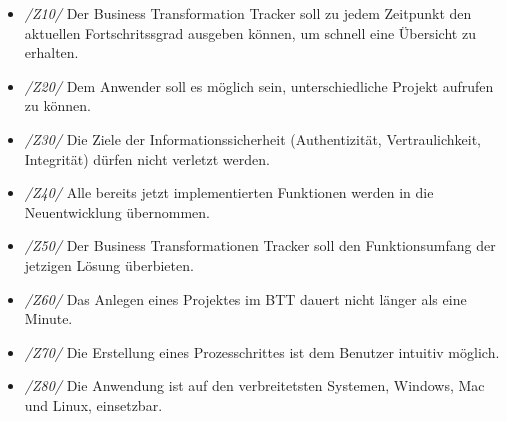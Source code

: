 \begin{itemize} 
    \item[] \emph{/Z10/} Der Business Transformation Tracker soll zu jedem Zeitpunkt den aktuellen Fortschritssgrad ausgeben können, um schnell eine Übersicht zu erhalten.
    \item[] \emph{/Z20/} Dem Anwender soll es möglich sein, unterschiedliche Projekt aufrufen zu können.
    \item[] \emph{/Z30/} Die Ziele der Informationssicherheit (Authentizität, Vertraulichkeit, Integrität) dürfen nicht verletzt werden.
    \item[] \emph{/Z40/} Alle bereits jetzt implementierten Funktionen werden in die Neuentwicklung übernommen.         
    \item[] \emph{/Z50/} Der Business Transformationen Tracker soll den Funktionsumfang der jetzigen Lösung überbieten.  
    \item[] \emph{/Z60/} Das Anlegen eines Projektes im BTT dauert nicht länger als eine Minute.
    \item[] \emph{/Z70/} Die Erstellung eines Prozesschrittes ist dem Benutzer intuitiv möglich.
    \item[] \emph{/Z80/} Die Anwendung ist auf den verbreitetsten Systemen, Windows, Mac und Linux, einsetzbar.
\end{itemize}

